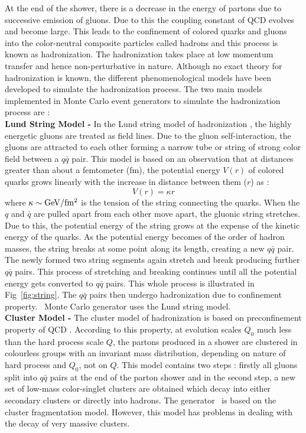 At the end of the shower, there is a decrease in the energy of partons due to successive emission of gluons. Due to this the coupling constant of QCD \alps evolves and become large. This leads to the confinement of colored quarks and gluons into the color-neutral composite particles called hadrons and this process is known as hadronization. The hadronization takes place at low momentum transfer and hence non-perturbative in nature. Although no exact theory for hadronization is known, the different phenomenological models have been developed to simulate the hadronization process. The two main models implemented in Monte Carlo event generators to simulate the hadronization process are : \\\newline
{\bf Lund String Model -} In the Lund string model of hadronization \cite{Andersson:1998tv}, the highly energetic gluons are treated as field lines. Due to the gluon self-interaction, the gluons are attracted to each other forming a narrow tube or string of strong color field between a $q\bar{q}$ pair. This model is based on an observation that at distances greater than about a femtometer (fm), the potential energy $V(r)$ of colored quarks grows linearly with the increase in distance between them ($r$) as :
\begin{equation}
V(r) = \kappa r
\end{equation}
where $\kappa \sim {\rm GeV/fm^2}$ is the tension of the string connecting the quarks. When the $q$ and $\bar{q}$ are pulled apart from each other move apart, the gluonic string stretches. Due to this, the potential energy of the string grows at the expense of the kinetic energy of the quarks. As the potential energy becomes of the order of hadron masses, the string breaks at some point along its length, creating a new $q\bar{q}$ pair. The newly formed two string segments again stretch and break producing further $q\bar{q}$ pairs. This process of stretching and breaking continues until all the potential energy gets converted to $q\bar{q}$ pairs. This whole process is illustrated in Fig~\ref{fig:string}. The $q\bar{q}$ pairs then undergo hadronization due to confinement property. \PYTHIA~Monte Carlo generator uses the Lund string model. \\ \newline
{\bf Cluster Model -} The cluster model of hadronization \cite{Marchesini:1987cf,Webber:1983if} is based on preconfinement property of QCD \cite{Amati:1979fg}. According to this property, at evolution scales $Q_0$ much less than the hard process scale $Q$, the partons produced in a shower are clustered in colourless groups with an invariant mass distribution, depending on nature of hard process and $Q_0$, not on $Q$. This model contains two steps : firstly all gluons split into $q\bar{q}$ pairs at the end of the parton shower and in the second step, a new set of low-mass color-singlet clusters are obtained which decay into either secondary clusters or directly into hadrons. The generator \HERWIG~is based on the cluster fragmentation model. However, this model has problems in dealing with the decay of very massive clusters. 

